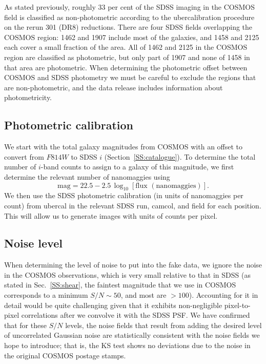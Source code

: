 \documentclass[twocolumn,useAMS,usenatbib]{mn2e}
\newcommand{\beq}{\begin{equation}}
\newcommand{\eeq}{\end{equation}}
\newcommand{\newtext}{}
\begin{document}
As stated previously, roughly 33 per cent of the \newtext{SDSS imaging
  in the} COSMOS field is
classified as non-photometric according to the ubercalibration
\citep{2008ApJ...674.1217P} procedure on the rerun 301 (DR8)
reductions.  There are four SDSS fields overlapping the COSMOS region:
1462 and 1907 include most of the galaxies, and 1458 and 2125 each
cover a small fraction of the area.  All of 1462 and 2125 in the
COSMOS region are classified as photometric, but only part of 1907 and
none of 1458 in that area are photometric.  When determining the
photometric offset between COSMOS and SDSS photometry we must be
careful to exclude the regions that are non-photometric, and the data
release includes information about photometricity.  

\subsection{Photometric calibration}

We start with the total galaxy magnitudes from COSMOS with an offset
to convert from $F814W$ to SDSS $i$ (Section~\ref{SS:catalogue}).  To
determine the total number of $i$-band counts to assign to a galaxy of
this magnitude, we first determine the relevant number of nanomaggies
using
\beq
\mathrm{mag} = 22.5 - 2.5\,\log_{10}{[\mathrm{flux}\,\, \mathrm{(nanomaggies)}]}.
\eeq
We then use the SDSS photometric calibration (in units of nanomaggies
per count) from ubercal in the relevant SDSS run, camcol, and field
for each position.  This will allow us to generate images with units
of counts per pixel.

\subsection{Noise level}

When determining the level of noise to put into the fake data, 
we ignore the noise in the COSMOS observations, which is very small
relative to that in SDSS (as stated in Sec.~\ref{SS:shear}, the faintest
magnitude that we use in COSMOS corresponds to a minimum $S/N \sim
50$, and most are $>100$).  Accounting for it in detail would be quite
challenging given that it exhibits non-negligible pixel-to-pixel
correlations after we convolve it with the SDSS PSF.   We have confirmed that
for these $S/N$ levels, the noise fields that result from adding the
desired level of uncorrelated Gaussian noise are statistically
consistent with the noise fields we hope to introduce; that is, the KS
test shows no deviations due to the noise in the
original COSMOS postage stamps.  
\end{document}
